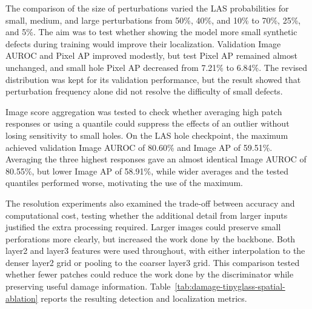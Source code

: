 The comparison of the size of perturbations varied the LAS probabilities for small, medium, and large perturbations from 50\%, 40\%, and 10\% to 70\%, 25\%, and 5\%. The aim was to test whether showing the model more small synthetic defects during training would improve their localization. Validation Image AUROC and Pixel AP improved modestly, but test Pixel AP remained almost unchanged, and small hole Pixel AP decreased from 7.21\% to 6.84\%. The revised distribution was kept for its validation performance, but the result showed that perturbation frequency alone did not resolve the difficulty of small defects.

Image score aggregation was tested to check whether averaging high patch responses or using a quantile could suppress the effects of an outlier without losing sensitivity to small holes. On the LAS hole checkpoint, the maximum achieved validation Image AUROC of 80.60\% and Image AP of 59.51\%. Averaging the three highest responses gave an almost identical Image AUROC of 80.55\%, but lower Image AP of 58.91\%, while wider averages and the tested quantiles performed worse, motivating the use of the maximum.

The resolution experiments also examined the trade-off between accuracy and computational cost, testing whether the additional detail from larger inputs justified the extra processing required. Larger images could preserve small perforations more clearly, but increased the work done by the backbone. Both layer2 and layer3 features were used throughout, with either interpolation to the denser layer2 grid or pooling to the coarser layer3 grid. This comparison tested whether fewer patches could reduce the work done by the discriminator while preserving useful damage information. Table~\ref{tab:damage-tinyglass-spatial-ablation} reports the resulting detection and localization metrics.

